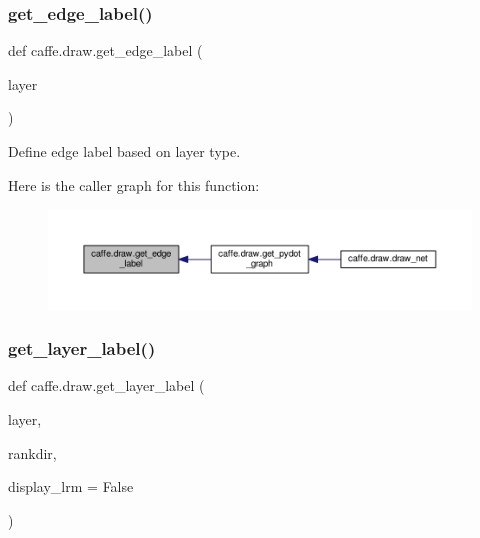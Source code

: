 \subsubsection{\texorpdfstring{get\+\_\+edge\+\_\+label()}{get\_edge\_label()}}
{\footnotesize\ttfamily def caffe.\+draw.\+get\+\_\+edge\+\_\+label (\begin{DoxyParamCaption}\item[{}]{layer }\end{DoxyParamCaption})}

\begin{DoxyVerb}Define edge label based on layer type.
\end{DoxyVerb}
 Here is the caller graph for this function\+:
\nopagebreak
\begin{figure}[H]
\begin{center}
\leavevmode
\includegraphics[width=350pt]{namespacecaffe_1_1draw_a672545af1643af2c11e6b19226eaf6c4_icgraph}
\end{center}
\end{figure}
\mbox{\label{namespacecaffe_1_1draw_a1ab4383ec4e16ed4e8f0e027c25c682a}} 
\subsubsection{\texorpdfstring{get\+\_\+layer\+\_\+label()}{get\_layer\_label()}}
{\footnotesize\ttfamily def caffe.\+draw.\+get\+\_\+layer\+\_\+label (\begin{DoxyParamCaption}\item[{}]{layer,  }\item[{}]{rankdir,  }\item[{}]{display\+\_\+lrm = {\ttfamily False} }\end{DoxyParamCaption})}

